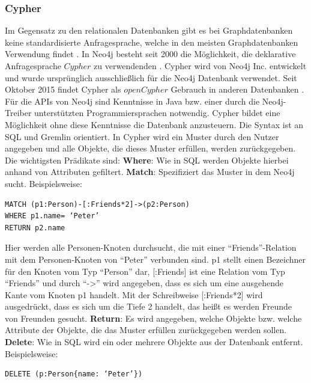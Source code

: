 \subsubsection{Cypher}
Im Gegensatz zu den relationalen Datenbanken gibt es bei Graphdatenbanken keine standardisierte Anfragesprache, welche in den meisten Graphdatenbanken Verwendung findet \parencite{han2011survey}. In Neo4j besteht seit 2000 die Möglichkeit, die deklarative Anfragesprache $Cypher$ zu verwendenden  \parencite{francis2018cypher}. Cypher wird von Neo4j Inc. entwickelt und wurde ursprünglich ausschließlich für die Neo4j Datenbank verwendet. Seit Oktober 2015  findet Cypher als $openCypher$ Gebrauch in anderen Datenbanken \parencite{francis2018cypher}. Für die APIs von Neo4j sind Kenntnisse in Java bzw. einer durch die Neo4j-Treiber unterstützten Programmiersprachen notwendig. Cypher bildet eine Möglichkeit ohne diese Kenntnisse die  Datenbank anzusteuern\parencite{vukotic2015neo4j}. Die Syntax ist an SQL und Gremlin orientiert. In Cypher wird ein Muster durch den Nutzer angegeben und alle Objekte, die dieses Muster erfüllen, werden zurückgegeben. Die wichtigsten  Prädikate sind: \newline
\textbf{Where}: Wie in SQL werden Objekte hierbei anhand von Attributen gefiltert. \newline
\textbf{Match}: Spezifiziert das Muster in dem Neo4j sucht. Beispielsweise:
\begin{Verbatim}[frame=single]
MATCH (p1:Person)-[:Friends*2]->(p2:Person) 
WHERE p1.name= ‘Peter’ 
RETURN p2.name
\end{Verbatim}
Hier werden alle Personen-Knoten durchsucht, die mit einer “Friends”-Relation mit dem Personen-Knoten von “Peter” verbunden sind. p1 stellt einen Bezeichner für den Knoten vom Typ “Person” dar, [:Friends] ist eine Relation vom Typ “Friends” und durch “->” wird angegeben, dass es sich um eine ausgehende Kante vom Knoten p1 handelt. Mit der Schreibweise [:Friends*2] wird ausgedrückt, dass es sich um die Tiefe 2 handelt, das heißt es werden Freunde von Freunden gesucht. \newline
\textbf{Return}: Es wird angegeben, welche Objekte bzw. welche Attribute der Objekte, die das Muster erfüllen zurückgegeben werden sollen.\newline
\textbf{Delete}: Wie in SQL  wird ein  oder mehrere Objekte aus der Datenbank entfernt. Beispielsweise:
\begin{Verbatim}[frame=single]
DELETE (p:Person{name: ‘Peter’})  
\end{Verbatim}
